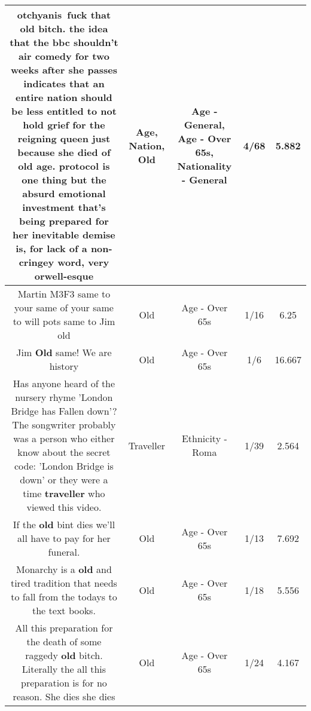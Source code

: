 \documentclass[11pt]{article}
\newlength\mylength
\begin{document}
\begin{center}
\begin{longtable}{|C{.65\mylength}|C{.30\mylength}|C{.12\mylength}|C{.12\mylength}|C{.12\mylength}|}
  \small otchyanis fuck that \textbf{old} bitch. the idea that the bbc shouldn't air comedy for two weeks after she passes indicates that an entire \textbf{nation} should be less entitled to not hold grief for the reigning queen just because she died of \textbf{old} \textbf{age}. protocol is one thing but the absurd emotional investment that's being prepared for her inevitable demise is, for lack of a non-cringey word, very orwell-esque\normalsize   & Age, Nation, Old & Age - General, Age - Over 65s, Nationality - General & 4/68 & 5.882 \\  \hline
  \small Martin M3F3 same to your same of your same to will pots same to Jim old\normalsize   & Old & Age - Over 65s & 1/16 & 6.25 \\  \hline
  \small Jim \textbf{Old} same! We are history\normalsize   & Old & Age - Over 65s & 1/6 & 16.667 \\  \hline
  \small Has anyone heard of the nursery rhyme 'London Bridge has Fallen down'?The songwriter probably was a person who either know about the secret code: 'London Bridge is down' or they were a time \textbf{traveller} who viewed this video.\normalsize   & Traveller & Ethnicity - Roma & 1/39 & 2.564 \\  \hline
  \small If the \textbf{old} bint dies we'll all have to pay for her funeral.\normalsize   & Old & Age - Over 65s & 1/13 & 7.692 \\  \hline
  \small Monarchy is a \textbf{old} and tired tradition that needs to fall from the todays to the text books.\normalsize   & Old & Age - Over 65s & 1/18 & 5.556 \\  \hline
  \small All this preparation for the death of some raggedy \textbf{old} bitch. Literally the all this preparation is for no reason. She dies she dies\normalsize   & Old & Age - Over 65s & 1/24 & 4.167 \\  \hline

\end{longtable}
\end{center}
\end{document}
